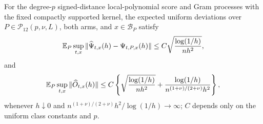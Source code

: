 For the degree-\(p\) signed-distance local-polynomial score and Gram processes with the fixed compactly supported kernel, the expected uniform deviations over \(P\in\mathcal P_{12}(p,\nu,L)\), both arms, and \(x\in\mathcal B_P\) satisfy
\[
 \mathbb E_P\sup_{t,x}\|\widehat\Psi_{t,x}(h)-\Psi_{t,P,x}(h)\|
 \leq C\sqrt{\log(1/h)\over nh^2},
\]
and
\[
 \mathbb E_P\sup_{t,x}\|\widehat O_{t,x}(h)\|
 \leq C\left\{\sqrt{\log(1/h)\over nh^2}+{\log(1/h)\over n^{(1+\nu)/(2+\nu)}h^2}\right\},
\]
whenever \(h\downarrow0\) and \(n^{(1+\nu)/(2+\nu)}h^2/\log(1/h)\to\infty\); \(C\) depends only on the uniform class constants and \(p\).